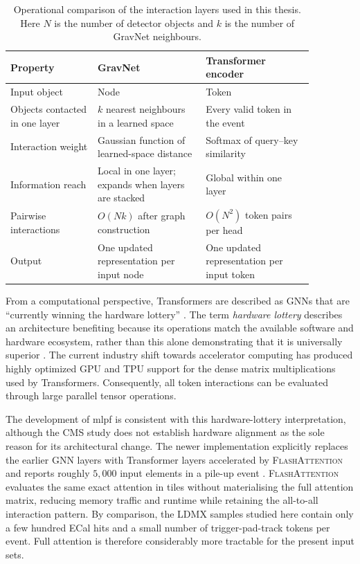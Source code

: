 \begin{table}[htbp]
    \centering
    \small
    \caption{Operational comparison of the interaction layers used in this
    thesis. Here \(N\) is the number of detector objects and \(k\) is the
    number of GravNet neighbours.}
    \label{tab:gravnet_transformer_comparison}
    \begin{tabular}{p{0.25\linewidth} p{0.31\linewidth} p{0.31\linewidth}}
        \hline
        Property & GravNet & Transformer encoder \\
        \hline
        Input object & Node & Token \\
        Objects contacted in one layer &
        \(k\) nearest neighbours in a learned space &
        Every valid token in the event \\
        Interaction weight &
        Gaussian function of learned-space distance &
        Softmax of query--key similarity \\
        Information reach &
        Local in one layer; expands when layers are stacked &
        Global within one layer \\
        Pairwise interactions &
        \(O(Nk)\) after graph construction &
        \(O(N^2)\) token pairs per head \\
        Output &
        One updated representation per input node &
        One updated representation per input token \\
        \hline
    \end{tabular}
\end{table}

From a computational perspective, Transformers are described as GNNs that are
``currently winning the hardware lottery'' \cite{joshi2025transformersgnn}.
The term \emph{hardware lottery} describes an architecture benefiting because
its operations match the available software and hardware ecosystem, rather
than this alone demonstrating that it is universally superior
\cite{hooker2020hardwarelottery}. The current industry shift towards
accelerator computing has produced highly optimized GPU and TPU support for
the dense matrix multiplications used by Transformers. Consequently, all
token interactions can be evaluated through large parallel tensor operations.

The development of \gls{mlpf} is consistent with this hardware-lottery
interpretation, although the CMS study does not establish hardware alignment
as the sole reason for its architectural change. The newer implementation
explicitly replaces the earlier GNN layers with Transformer layers accelerated
by \textsc{FlashAttention} and reports roughly \(5{,}000\) input elements in a
pile-up event \cite{pata2026-mlpf}. \textsc{FlashAttention} evaluates the same
exact attention in tiles without materialising the full attention matrix,
reducing memory traffic and runtime while retaining the all-to-all interaction
pattern. By comparison, the LDMX samples studied here contain only a few
hundred ECal hits and a small number of trigger-pad-track tokens per event.
Full attention is therefore considerably more tractable for the present input
sets.


